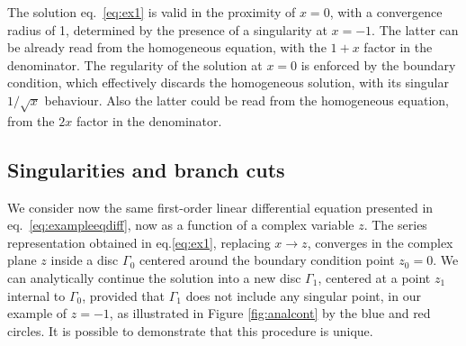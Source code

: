 The solution eq.~\ref{eq:ex1} is valid in the proximity of $x=0$,
with a convergence radius of 1,
determined by the presence of a singularity at $x=-1$.
The latter can be already read from the homogeneous equation,
with the $1+x$ factor in the denominator.
The regularity of the solution at $x=0$ is enforced by the boundary condition,
which effectively discards the homogeneous solution,
with its singular $1/\sqrt{x}$ behaviour.
Also the latter could be read from the homogeneous equation,
from the $2x$ factor in the denominator.

\subsection{Singularities and branch cuts}
\label{sec:cuts}
We consider now the same first-order linear differential equation
presented in eq.~\ref{eq:exampleeqdiff},
now as a function of a complex variable $z$.
The series representation obtained in eq.\ref{eq:ex1}, replacing $x\to z$,
converges in the complex plane $z$ inside a disc $\Gamma_0$
centered around the boundary condition point $z_0=0$.
We can analytically continue the solution into a new disc $\Gamma_1$,
centered at a point $z_1$ internal to $\Gamma_0$,
provided that $\Gamma_1$ does not include
any singular point, in our example of $z=-1$,
as illustrated in Figure \ref{fig:analcont} by the blue and red circles.
It is possible to demonstrate that this procedure is unique.
